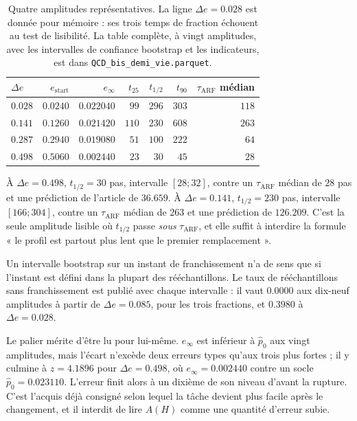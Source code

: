 \documentclass[11pt,a4paper]{article}
\begin{document}
\begin{table}[htbp]
  \centering
  \begin{tabular}{lrrrrrr}
    \toprule
    $\Delta e$ & $e_{\mathrm{start}}$ & $e_\infty$ & $t_{25}$ & $t_{1/2}$ & $t_{90}$
    & $\tau_{\mathrm{ARF}}$ médian \\
    \midrule
    $0.028$ & $0.0240$ & $0.022040$ & $99$  & $296$ & $303$ & $118$ \\
    $0.141$ & $0.1260$ & $0.021420$ & $110$ & $230$ & $608$ & $263$ \\
    $0.287$ & $0.2940$ & $0.019080$ & $51$  & $100$ & $222$ & $64$  \\
    $0.498$ & $0.5060$ & $0.002440$ & $23$  & $30$  & $45$  & $28$  \\
    \bottomrule
  \end{tabular}
  \caption{Quatre amplitudes représentatives. La ligne $\Delta e = 0.028$ est donnée pour
  mémoire : ses trois temps de fraction échouent au test de lisibilité. La table complète, à
  vingt amplitudes, avec les intervalles de confiance bootstrap et les indicateurs, est dans
  \texttt{QCD\_bis\_demi\_vie.parquet}.}
\end{table}

À $\Delta e = 0.498$, $t_{1/2} = 30$ pas, intervalle $[28 ; 32]$, contre un
$\tau_{\mathrm{ARF}}$ médian de $28$ pas et une prédiction de l'article de $36.659$. À
$\Delta e = 0.141$, $t_{1/2} = 230$ pas, intervalle $[166 ; 304]$, contre un
$\tau_{\mathrm{ARF}}$ médian de $263$ et une prédiction de $126.209$. C'est la seule
amplitude lisible où $t_{1/2}$ passe \emph{sous} $\tau_{\mathrm{ARF}}$, et elle suffit à
interdire la formule « le profil est partout plus lent que le premier remplacement ».

Un intervalle bootstrap sur un instant de franchissement n'a de sens que si l'instant est
défini dans la plupart des rééchantillons. Le taux de rééchantillons sans franchissement est
publié avec chaque intervalle : il vaut $0.0000$ aux dix-neuf amplitudes à partir de
$\Delta e = 0.085$, pour les trois fractions, et $0.3980$ à $\Delta e = 0.028$.

Le palier mérite d'être lu pour lui-même. $e_\infty$ est inférieur à $\hat{p}_0$ aux vingt
amplitudes, mais l'écart n'excède deux erreurs types qu'aux trois plus fortes ; il y culmine
à $z = 4.1896$ pour $\Delta e = 0.498$, où $e_\infty = 0.002440$ contre un socle
$\hat{p}_0 = 0.023110$. L'erreur finit alors à un dixième de son niveau d'avant la rupture.
C'est l'acquis déjà consigné selon lequel la tâche devient plus facile après le changement,
et il interdit de lire $A(H)$ comme une quantité d'erreur subie.
\end{document}
